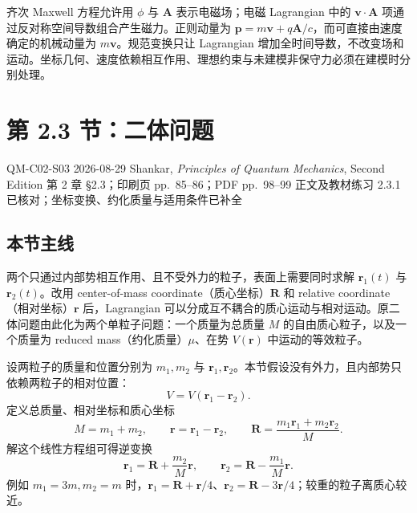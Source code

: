 齐次 Maxwell 方程允许用 $\phi$ 与 $\bm A$ 表示电磁场；电磁 Lagrangian 中的 $\bm v\cdot\bm A$ 项通过反对称空间导数组合产生磁力。正则动量为 $\bm p=m\bm v+q\bm A/c$，而可直接由速度确定的机械动量为 $m\bm v$。规范变换只让 Lagrangian 增加全时间导数，不改变场和运动。坐标几何、速度依赖相互作用、理想约束与未建模非保守力必须在建模时分别处理。

\section{第 2.3 节：二体问题}
\label{section:QM-C02-S03}

\studymeta
  {QM-C02-S03}
  {2026-08-29}
  {Shankar, \textit{Principles of Quantum Mechanics}, Second Edition}
  {第 2 章 \S 2.3；印刷页 pp.~85--86；PDF pp.~98--99}
  {正文及教材练习 2.3.1 已核对；坐标变换、约化质量与适用条件已补全}

\subsection{本节主线}

两个只通过内部势相互作用、且不受外力的粒子，表面上需要同时求解 $\bm r_1(t)$ 与 $\bm r_2(t)$。改用 center-of-mass coordinate（质心坐标）$\bm R$ 和 relative coordinate（相对坐标）$\bm r$ 后，Lagrangian 可以分成互不耦合的质心运动与相对运动。原二体问题由此化为两个单粒子问题：一个质量为总质量 $M$ 的自由质心粒子，以及一个质量为 reduced mass（约化质量）$\mu$、在势 $V(\bm r)$ 中运动的等效粒子。


设两粒子的质量和位置分别为 $m_1,m_2$ 与 $\bm r_1,\bm r_2$。本节假设没有外力，且内部势只依赖两粒子的相对位置：
\begin{equation}
  V=V(\bm r_1-\bm r_2).
  \label{eq:QM-C02-S03-relative-potential}
\end{equation}
定义总质量、相对坐标和质心坐标
\begin{equation}
  M=m_1+m_2,
  \qquad
  \bm r=\bm r_1-\bm r_2,
  \qquad
  \bm R=\frac{m_1\bm r_1+m_2\bm r_2}{M}.
  \label{eq:QM-C02-S03-coordinate-definitions}
\end{equation}
解这个线性方程组可得逆变换
\begin{equation}
  \boxed{
  \bm r_1=\bm R+\frac{m_2}{M}\bm r,
  \qquad
  \bm r_2=\bm R-\frac{m_1}{M}\bm r.}
  \label{eq:QM-C02-S03-inverse-transform}
\end{equation}
例如 $m_1=3m,m_2=m$ 时，$\bm r_1=\bm R+\bm r/4$、$\bm r_2=\bm R-3\bm r/4$；较重的粒子离质心较近。

